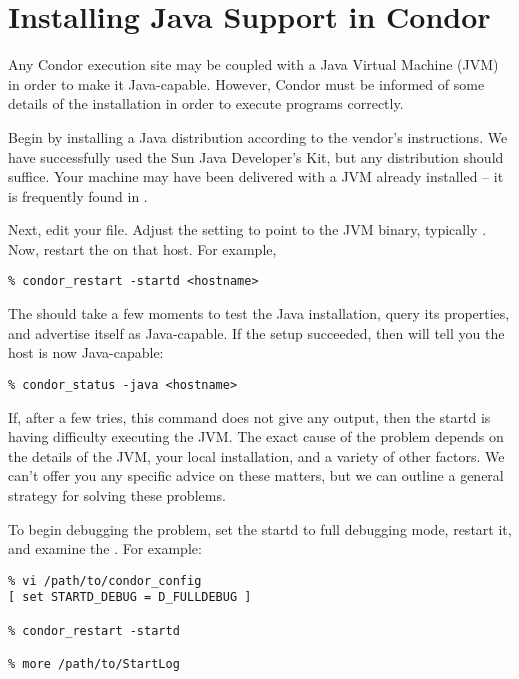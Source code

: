 \section{\label{sec:java-install}Installing Java Support in Condor}


Any Condor execution site may be coupled with a
Java Virtual Machine (JVM) in order to make it Java-capable.
However, Condor must be informed of some details of the
installation in order to execute programs correctly.

Begin by installing a Java distribution according to the vendor's
instructions.  We have successfully used the Sun Java Developer's
Kit, but any distribution should suffice.  Your machine may have
been delivered with a JVM already installed -- it is frequently
found in .

Next, edit your  file.  Adjust the 
setting to point to the JVM binary, typically .
Now, restart the  on that host.  For example,

\begin{verbatim}
% condor_restart -startd <hostname>
\end{verbatim}

The  should take a few moments to test the Java
installation, query its properties, and advertise itself as
Java-capable.  If the setup succeeded, then  will
tell you the host is now Java-capable:

\begin{verbatim}
% condor_status -java <hostname>
\end{verbatim}

If, after a few tries, this command does not give any output,
then the startd is having difficulty executing the JVM.
The exact cause of the problem depends on the details of the
JVM, your local installation, and a variety of other factors.
We can't offer you any specific advice on these matters, but
we can outline a general strategy for solving these problems.

To begin debugging the problem, set the startd to full
debugging mode, restart it, and examine the
.  For example:

\begin{verbatim}
% vi /path/to/condor_config
[ set STARTD_DEBUG = D_FULLDEBUG ]

% condor_restart -startd

% more /path/to/StartLog
\end{verbatim}

